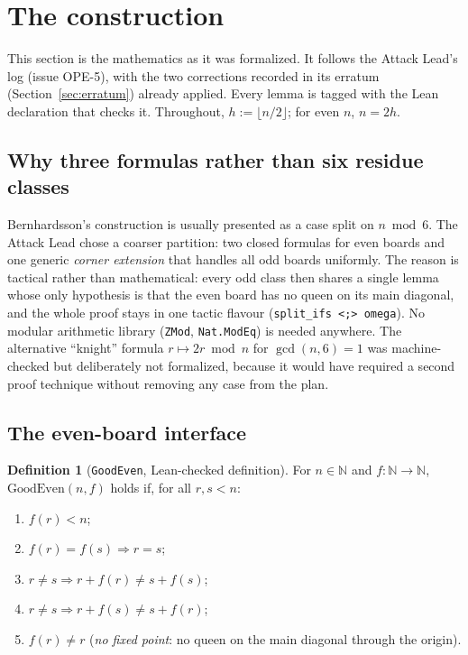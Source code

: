 \documentclass[11pt,a4paper]{article}
\theoremstyle{definition}
\newtheorem{definition}[theorem]{Definition}
\theoremstyle{remark}
\newcommand{\lean}[1]{\texttt{#1}}
\newcommand{\N}{\mathbb{N}}
\newcommand{\GoodEven}{\mathrm{GoodEven}}
\begin{document}
\section{The construction}
\label{sec:construction}

This section is the mathematics as it was formalized. It follows the Attack Lead's log
(issue OPE-5), with the two corrections recorded in its erratum (Section~\ref{sec:erratum})
already applied. Every lemma is tagged with the Lean declaration that checks it. Throughout,
$h := \lfloor n/2\rfloor$; for even $n$, $n=2h$.

\subsection{Why three formulas rather than six residue classes}

Bernhardsson's construction is usually presented as a case split on $n \bmod 6$. The
Attack Lead chose a coarser partition: two closed formulas for even boards and one generic
\emph{corner extension} that handles all odd boards uniformly. The reason is tactical
rather than mathematical: every odd class then shares a single lemma whose only hypothesis
is that the even board has no queen on its main diagonal, and the whole proof stays in one
tactic flavour (\lean{split\_ifs <;> omega}). No modular arithmetic library (\lean{ZMod},
\lean{Nat.ModEq}) is needed anywhere. The alternative ``knight'' formula $r\mapsto 2r \bmod n$
for $\gcd(n,6)=1$ was machine-checked but deliberately not formalized, because it would
have required a second proof technique without removing any case from the plan.

\subsection{The even-board interface}

\begin{definition}[\lean{GoodEven}, Lean-checked definition]
For $n\in\N$ and $f:\N\to\N$, $\GoodEven(n,f)$ holds if, for all $r,s<n$:
\begin{enumerate}[nosep,label=(\alph*)]
\item $f(r)<n$;
\item $f(r)=f(s)\Rightarrow r=s$;
\item $r\neq s\Rightarrow r+f(r)\neq s+f(s)$;
\item $r\neq s\Rightarrow r+f(s)\neq s+f(r)$;
\item $f(r)\neq r$ \quad (\emph{no fixed point}: no queen on the main diagonal through the origin).
\end{enumerate}
\end{definition}
\end{document}
